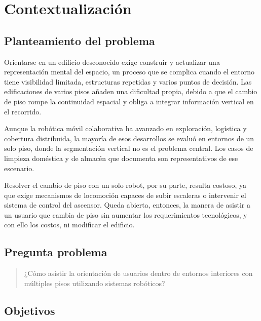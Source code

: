 \chapter{Contextualización}

\section{Planteamiento del problema}

Orientarse en un edificio desconocido exige construir y actualizar una representación
mental del espacio, un proceso que se complica cuando el entorno tiene visibilidad
limitada, estructuras repetidas y varios puntos de decisión. Las edificaciones de
varios pisos añaden una dificultad propia, debido a que el cambio de piso rompe la
continuidad espacial y obliga a integrar información vertical en el recorrido.

Aunque la robótica móvil colaborativa ha avanzado en exploración, logística y
cobertura distribuida, la mayoría de esos desarrollos se evaluó en entornos de un solo
piso, donde la segmentación vertical no es el problema central. Los casos de limpieza
doméstica y de almacén que documenta \textcite{nair2024collaborative} son
representativos de ese escenario.

Resolver el cambio de piso con un solo robot, por su parte, resulta costoso, ya que
exige mecanismos de locomoción capaces de subir escaleras o intervenir el sistema de
control del ascensor. Queda abierta, entonces, la manera de asistir a un usuario que
cambia de piso sin aumentar los requerimientos tecnológicos, y con ello los costos, ni
modificar el edificio.

\section{Pregunta problema}

\begin{quote}
¿Cómo asistir la orientación de usuarios dentro de entornos interiores con
múltiples pisos utilizando sistemas robóticos?
\end{quote}

\section{Objetivos}

